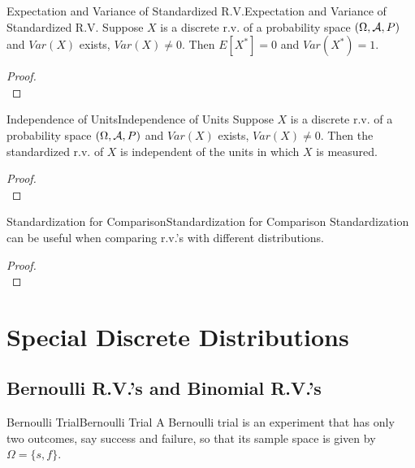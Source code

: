 \documentclass{elegantbook}
\begin{document}
\begin{theorem}{Expectation and Variance of Standardized R.V.}{Expectation and Variance of Standardized R.V.}
Suppose $X$ is a discrete r.v. of a probability space $(\Omega,\mathcal{A}, P)$ and $Var(X)$ exists, $Var(X)\neq0$. Then $E[X^* ]=0$ and $Var(X^* )=1$.
\end{theorem}

\begin{proof}
\\[4cm]\vspace{0.01cm}
\end{proof}

\begin{theorem}{Independence of Units}{Independence of Units}
Suppose $X$ is a discrete r.v. of a probability space $(\Omega,\mathcal{A}, P)$ and $Var(X)$ exists, $Var(X)\neq0$. Then the standardized r.v. of $X$ is independent of the units in which $X$ is measured.
\end{theorem}

\begin{proof}
\\[4cm]\vspace{0.01cm}
\end{proof}

\begin{remark}{Standardization for Comparison}{Standardization for Comparison}
Standardization can be useful when comparing r.v.'s with dif\/ferent distributions.
\end{remark}

\begin{proof}
\\[4cm]\vspace{0.01cm}
\end{proof}

\chapter{Special Discrete Distributions}
\section{Bernoulli R.V.'s and Binomial R.V.'s}

\begin{definition}{Bernoulli Trial}{Bernoulli Trial}
A Bernoulli trial is an experiment that has only two outcomes, say success and failure, so that its sample space is given by $\Omega=\{s,f\}$.
\end{definition}
\end{document}
